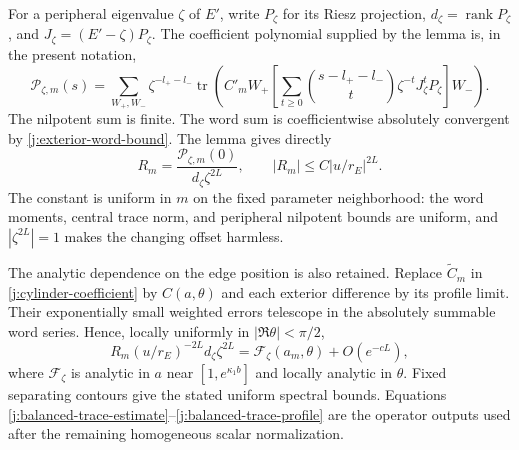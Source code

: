 For a peripheral eigenvalue $\zeta$ of $E'$, write $P_\zeta$ for its
Riesz projection, $d_\zeta=\operatorname{rank}P_\zeta$, and
$J_\zeta=(E'-\zeta)P_\zeta$. The coefficient polynomial supplied by the
lemma is, in the present notation,
\begin{equation}\label{j:cylinder-coefficient}
 \mathcal P_{\zeta,m}(s)=
 \sum_{W_+,W_-}\zeta^{-l_+-l_-}
 \operatorname{tr}\!\left(
 C'_mW_+\left[\sum_{t\ge0}
 \binom{s-l_+-l_-}{t}\zeta^{-t}J_\zeta^tP_\zeta\right]W_-\right).
\end{equation}
The nilpotent sum is finite. The word sum is coefficientwise absolutely
convergent by \eqref{j:exterior-word-bound}. The lemma gives directly
\begin{equation}\label{j:balanced-trace-estimate}
 R_m=\frac{\mathcal P_{\zeta,m}(0)}{d_\zeta\zeta^{2L}},
 \qquad |R_m|\le C|u/r_E|^{2L}.
\end{equation}
The constant is uniform in $m$ on the fixed parameter neighborhood:
the word moments, central trace norm, and peripheral nilpotent bounds are
uniform, and $|\zeta^{2L}|=1$ makes the changing offset harmless.

The analytic dependence on the edge position is also retained. Replace
$\widetilde C_m$ in \eqref{j:cylinder-coefficient} by $C(a,\theta)$ and
each exterior difference by its profile limit. Their exponentially small
weighted errors telescope in the absolutely summable word series. Hence,
locally uniformly in $|\Re\theta|<\pi/2$,
\begin{equation}\label{j:balanced-trace-profile}
 R_m(u/r_E)^{-2L}d_\zeta\zeta^{2L}
 =\mathcal F_\zeta(a_m,\theta)+O(e^{-cL}),
\end{equation}
where $\mathcal F_\zeta$ is analytic in $a$ near
$[1,e^{\kappa_1b}]$ and locally analytic in $\theta$. Fixed separating
contours give the stated uniform spectral bounds. Equations
\eqref{j:balanced-trace-estimate}--\eqref{j:balanced-trace-profile} are
the operator outputs used after the remaining homogeneous scalar
normalization.
